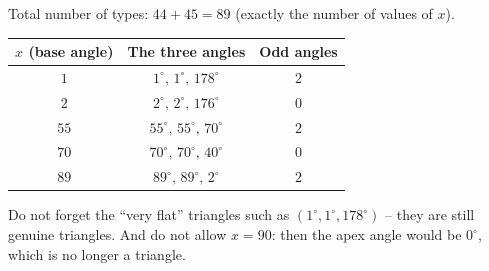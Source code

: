 {
Total number of types: $44+45=89$ (exactly the number of values of $x$).
\begin{center}\small
\begin{tabular}{|c|c|c|}
\hline
\rowcolor{tmBlue!10}$x$ (base angle) & The three angles & Odd angles\\ \hline
$1$ & $1^\circ,\,1^\circ,\,178^\circ$ & $2$\\ \hline
$2$ & $2^\circ,\,2^\circ,\,176^\circ$ & $0$\\ \hline
$55$ & $55^\circ,\,55^\circ,\,70^\circ$ & $2$\\ \hline
$70$ & $70^\circ,\,70^\circ,\,40^\circ$ & $0$\\ \hline
$89$ & $89^\circ,\,89^\circ,\,2^\circ$ & $2$\\ \hline
\end{tabular}
\end{center}
\begin{warnbox}Do not forget the ``very flat'' triangles such as $(1^\circ,1^\circ,178^\circ)$ -- they are still genuine triangles. And do not allow $x=90$: then the apex angle would be $0^\circ$, which is no longer a triangle.\end{warnbox}
}

